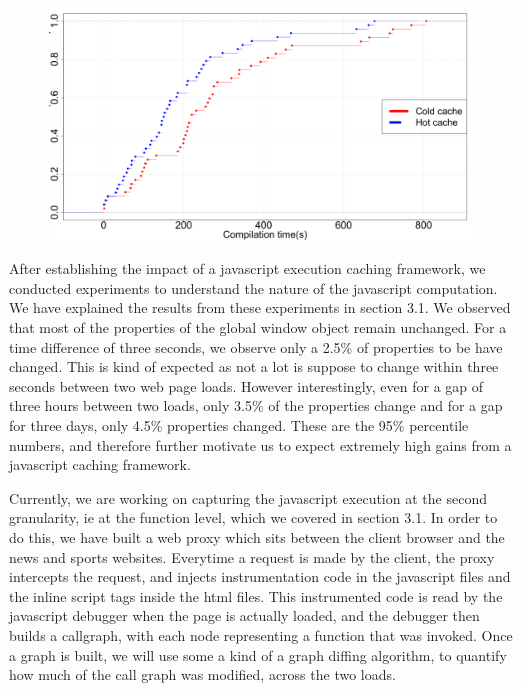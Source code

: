 \begin{figure}[t]
\centering
\includegraphics[width=0.9\columnwidth]{figs/chrome_compile.png}
\label{fig:compile_p2}
\end{figure}

After establishing the impact of a javascript execution caching framework, we conducted
experiments to understand the nature of the javascript computation. We have explained the
results from these experiments in section 3.1. 
We observed that most of the properties of the global window object remain unchanged.
For a time difference of three seconds, we observe only a 2.5\% of properties to be have
changed. This is kind of expected as not a lot is suppose to change within three seconds 
between two web page loads. However interestingly, even for a gap of three hours between
two loads, only 3.5\% of the properties change and for a gap for three days, only 4.5\% 
properties changed. These are the 95\% percentile numbers, and therefore 
further motivate us to expect extremely high gains from a javascript caching
framework. 


Currently, we are working on capturing the javascript execution at the second granularity,
ie at the function level, which we covered in section 3.1. In order to do this, we have built
a web proxy which sits between the client browser and the news and sports websites. Everytime 
a request is made by the client, the proxy intercepts the request, and injects instrumentation
code in the javascript files and the inline script tags inside the html files. 
This instrumented code is read by the javascript debugger when the page is actually loaded, and 
the debugger then builds a callgraph, with each node representing a function that was invoked. 
Once a graph is built, we will use some a kind of a graph diffing algorithm, to quantify
how much of the call graph was modified, across the two loads. 

